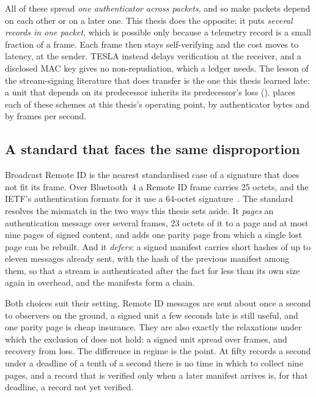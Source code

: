 All of these spread \emph{one authenticator across packets}, and so make packets depend on each
other or on a later one. This thesis does the opposite: it puts \emph{several records in one
packet}, which is possible only because a telemetry record is a small fraction of a frame. Each
frame then stays self-verifying and the cost moves to latency, at the sender. TESLA instead delays
verification at the receiver, and a disclosed MAC key gives no non-repudiation, which a ledger
needs. The lesson of the stream-signing literature that does transfer is the one this thesis
learned late: a unit that depends on its predecessor inherits its predecessor's loss
().  places each of these schemes at this thesis's operating
point, by authenticator bytes and by frames per second.

\subsection{A standard that faces the same disproportion}\label{sec:bg-drip}

Broadcast Remote ID is the nearest standardised case of a signature that does not fit its
frame. Over Bluetooth~4 a Remote ID frame carries 25 octets, and the IETF's authentication
formats for it use a 64-octet signature~\cite{rfc9575}. The standard resolves the mismatch in
the two ways this thesis sets aside. It \emph{pages} an authentication message over several
frames, 23 octets of it to a page and at most nine pages of signed content, and adds one parity
page from which a single lost page can be rebuilt. And it \emph{defers}: a signed manifest
carries short hashes of up to eleven messages already sent, with the hash of the previous
manifest among them, so that a stream is authenticated after the fact for less than its own
size again in overhead, and the manifests form a chain.

Both choices suit their setting. Remote ID messages are sent about once a second to observers
on the ground, a signed unit a few seconds late is still useful, and one parity page is cheap
insurance. They are also exactly the relaxations under which the exclusion of
 does not hold: a signed unit spread over frames, and recovery from loss.
The difference in regime is the point. At fifty records a second under a deadline of a tenth of
a second there is no time in which to collect nine pages, and a record that is verified only
when a later manifest arrives is, for that deadline, a record not yet verified.

